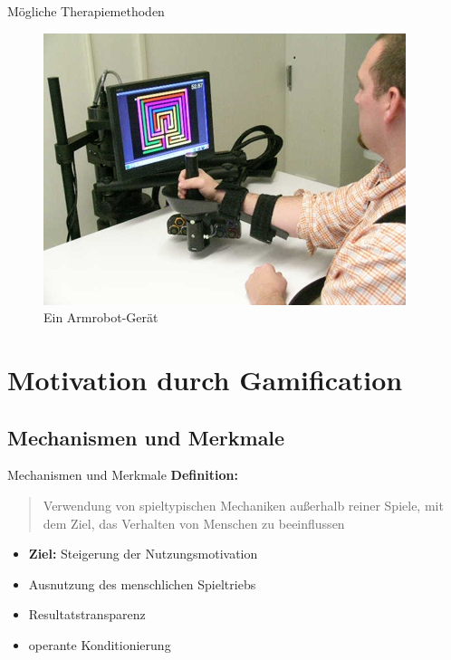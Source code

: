 \documentclass[hyphens]{beamer}
\begin{document}
\begin{frame}{Mögliche Therapiemethoden}
\begin{figure}
	\includegraphics[scale=0.6]{pics/armrobot}
	\caption{Ein Armrobot-Gerät}
\end{figure}
\end{frame}

\section{Motivation durch Gamification}

\subsection{Mechanismen und Merkmale}

\begin{frame}{Mechanismen und Merkmale}
\textbf{Definition:} \\
\blockquote{Verwendung von spieltypischen Mechaniken außerhalb reiner Spiele, mit dem Ziel, das Verhalten von Menschen zu beeinflussen}
\pause
\hspace{0.5cm}
\begin{itemize}[<+->]
	\item \textbf{Ziel:} Steigerung der Nutzungsmotivation
	\item Ausnutzung des menschlichen Spieltriebs
	\item Resultatstransparenz
	\item operante Konditionierung
\end{itemize}
\end{frame}
\end{document}
